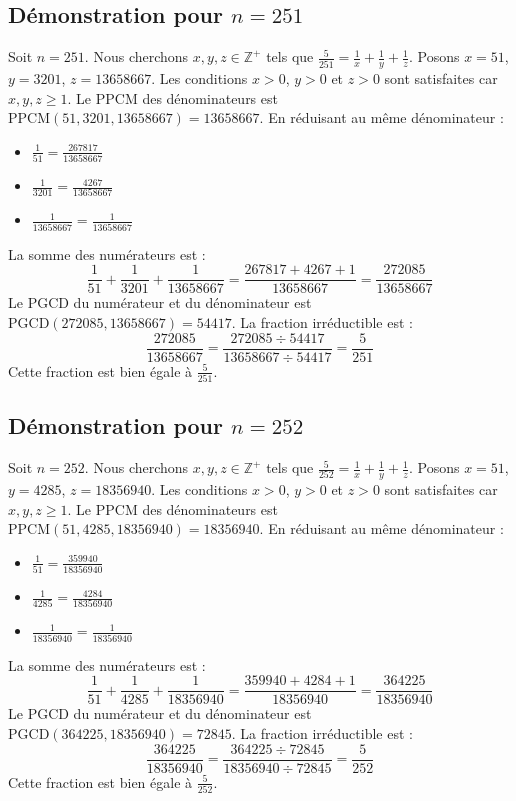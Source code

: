 \documentclass[11pt,a4paper]{article}
\begin{document}
\subsection{Démonstration pour $n = 251$}
Soit $n = 251$. Nous cherchons $x, y, z \in \mathbb{Z}^{+}$ tels que $\frac{5}{251} = \frac{1}{x} + \frac{1}{y} + \frac{1}{z}$.
Posons $x = 51$, $y = 3201$, $z = 13658667$.
Les conditions $x > 0$, $y > 0$ et $z > 0$ sont satisfaites car $x, y, z \geq 1$.
Le PPCM des dénominateurs est $\text{PPCM}(51, 3201, 13658667) = 13658667$.
En réduisant au même dénominateur :
\begin{itemize}
    \item $\frac{1}{51} = \frac{267817}{13658667}$
    \item $\frac{1}{3201} = \frac{4267}{13658667}$
    \item $\frac{1}{13658667} = \frac{1}{13658667}$
\end{itemize}
La somme des numérateurs est :
$$ \frac{1}{51} + \frac{1}{3201} + \frac{1}{13658667} = \frac{267817 + 4267 + 1}{13658667} = \frac{272085}{13658667} $$
Le PGCD du numérateur et du dénominateur est $\text{PGCD}(272085, 13658667) = 54417$.
La fraction irréductible est :
$$ \frac{272085}{13658667} = \frac{272085 \div 54417}{13658667 \div 54417} = \frac{5}{251} $$
Cette fraction est bien égale à $\frac{5}{251}$.

\subsection{Démonstration pour $n = 252$}
Soit $n = 252$. Nous cherchons $x, y, z \in \mathbb{Z}^{+}$ tels que $\frac{5}{252} = \frac{1}{x} + \frac{1}{y} + \frac{1}{z}$.
Posons $x = 51$, $y = 4285$, $z = 18356940$.
Les conditions $x > 0$, $y > 0$ et $z > 0$ sont satisfaites car $x, y, z \geq 1$.
Le PPCM des dénominateurs est $\text{PPCM}(51, 4285, 18356940) = 18356940$.
En réduisant au même dénominateur :
\begin{itemize}
    \item $\frac{1}{51} = \frac{359940}{18356940}$
    \item $\frac{1}{4285} = \frac{4284}{18356940}$
    \item $\frac{1}{18356940} = \frac{1}{18356940}$
\end{itemize}
La somme des numérateurs est :
$$ \frac{1}{51} + \frac{1}{4285} + \frac{1}{18356940} = \frac{359940 + 4284 + 1}{18356940} = \frac{364225}{18356940} $$
Le PGCD du numérateur et du dénominateur est $\text{PGCD}(364225, 18356940) = 72845$.
La fraction irréductible est :
$$ \frac{364225}{18356940} = \frac{364225 \div 72845}{18356940 \div 72845} = \frac{5}{252} $$
Cette fraction est bien égale à $\frac{5}{252}$.
\end{document}
